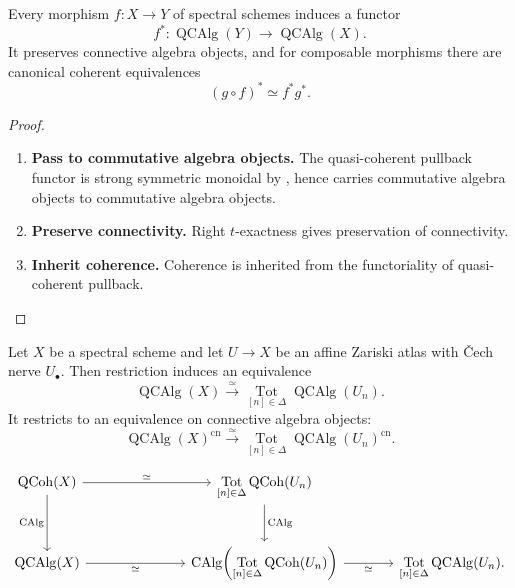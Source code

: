 \begin{proposition}
\label{prop:pullback-qcalg}
Every morphism $f:X\to Y$ of spectral schemes induces a functor
\[
    f^*
    \colon
    \operatorname{QCAlg}(Y)
    \longrightarrow
    \operatorname{QCAlg}(X).
\]
It preserves connective algebra objects, and for composable morphisms
there are canonical coherent equivalences
\[
    (g\circ f)^*
    \simeq
    f^*g^*.
\]
\end{proposition}

\begin{proof}
\leavevmode
\begin{enumerate}[label=\textup{(\arabic*)}]
    \item \textbf{Pass to commutative algebra objects.}
    The quasi-coherent pullback functor is strong symmetric monoidal by
    , hence carries commutative algebra objects to
    commutative algebra objects.

    \item \textbf{Preserve connectivity.}
    Right $t$-exactness gives preservation of
    connectivity.

    \item \textbf{Inherit coherence.}
    Coherence is inherited from the functoriality of
    quasi-coherent pullback.
\end{enumerate}
\end{proof}

\begin{proposition}
\label{prop:qcalg-zariski-descent}
Let \(X\) be a spectral scheme and let \(U\to X\) be an affine Zariski
atlas with \v{C}ech nerve \(U_\bullet\). Then restriction induces an
equivalence
\[
    \operatorname{QCAlg}(X)
    \xrightarrow{\simeq}
    \operatorname*{Tot}_{[n]\in\Delta}
    \operatorname{QCAlg}(U_n).
\]
It restricts to an equivalence on connective algebra objects:
\[
    \operatorname{QCAlg}(X)^{\mathrm{cn}}
    \xrightarrow{\simeq}
    \operatorname*{Tot}_{[n]\in\Delta}
    \operatorname{QCAlg}(U_n)^{\mathrm{cn}}.
\]
\end{proposition}

\[
\begin{tikzcd}[column sep=large, row sep=large]
    \QCoh(X)
        \arrow[rr, "\simeq"]
        \arrow[d, "\CAlg"']
    &&
    \displaystyle
    \operatorname*{Tot}_{[n]\in\Delta}\QCoh(U_n)
        \arrow[d, "\CAlg"]
    \\
    \operatorname{QCAlg}(X)
        \arrow[rr, "\simeq"']
    &&
    \displaystyle
    \CAlg\!\left(
        \operatorname*{Tot}_{[n]\in\Delta}\QCoh(U_n)
    \right)
        \arrow[r, "\simeq"']
    &
    \displaystyle
    \operatorname*{Tot}_{[n]\in\Delta}\operatorname{QCAlg}(U_n).
\end{tikzcd}
\]


